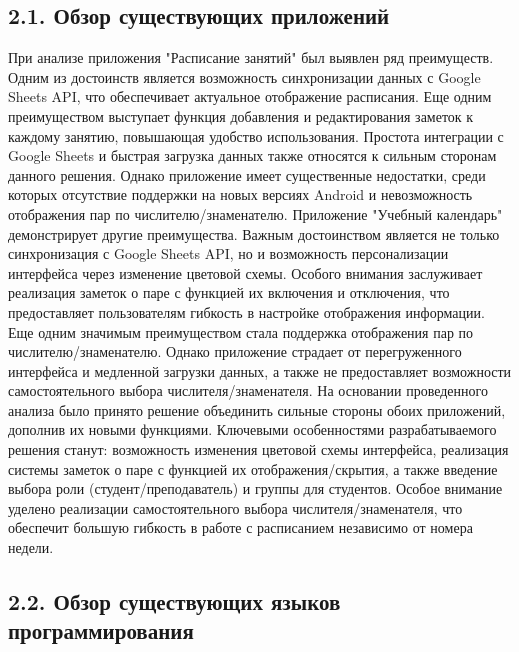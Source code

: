 \documentclass{vsureport}
\begin{document}
\subsection*{2.1. Обзор существующих приложений}
При анализе приложения "Расписание занятий" был выявлен ряд преимуществ. Одним из достоинств является возможность синхронизации данных с Google Sheets API, что обеспечивает актуальное отображение расписания. Еще одним преимуществом выступает функция добавления и редактирования заметок к каждому занятию, повышающая удобство использования. Простота интеграции с Google Sheets и быстрая загрузка данных также относятся к сильным сторонам данного решения. Однако приложение имеет существенные недостатки, среди которых отсутствие поддержки на новых версиях Android и невозможность отображения пар по числителю/знаменателю.\cite{ref2}
Приложение "Учебный календарь" демонстрирует другие преимущества. Важным достоинством является не только синхронизация с Google Sheets API, но и возможность персонализации интерфейса через изменение цветовой схемы. Особого внимания заслуживает реализация заметок о паре с функцией их включения и отключения, что предоставляет пользователям гибкость в настройке отображения информации. Еще одним значимым преимуществом стала поддержка отображения пар по числителю/знаменателю. Однако приложение страдает от перегруженного интерфейса и медленной загрузки данных, а также не предоставляет возможности самостоятельного выбора числителя/знаменателя.
На основании проведенного анализа было принято решение объединить сильные стороны обоих приложений, дополнив их новыми функциями. Ключевыми особенностями разрабатываемого решения станут: возможность изменения цветовой схемы интерфейса, реализация системы заметок о паре с функцией их отображения/скрытия, а также введение выбора роли (студент/преподаватель) и группы для студентов. Особое внимание уделено реализации самостоятельного выбора числителя/знаменателя, что обеспечит большую гибкость в работе с расписанием независимо от номера недели.

\subsection*{2.2. Обзор существующих языков программирования}
\end{document}
